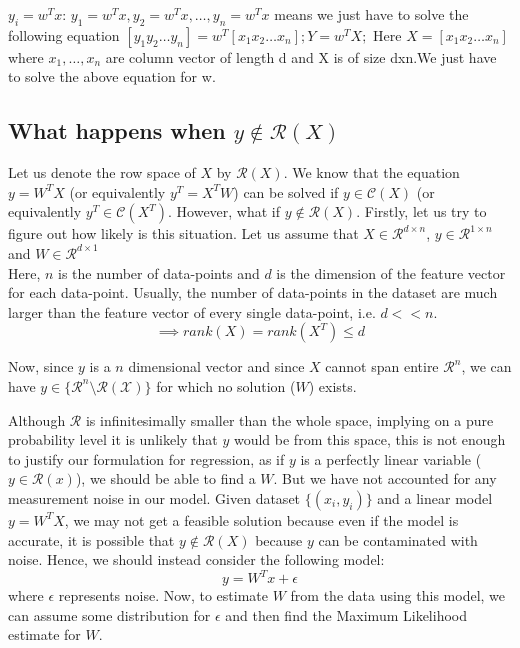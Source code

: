 \documentclass[11pt]{article}
\begin{document}
$ y_i =w^{T}x$:
$y_1 = w^{T}x, y_2 = w^{T}x , \ldots, y_n = w^{T}x$
means we just have to solve the following equation
$[y_1 y_2 \ldots y_n] = w^{T}[x_1 x_2 \ldots x_n];
Y = w^{T}X;$ Here $X = [x_1 x_2 \ldots x_n]
$
where $x_1, \ldots,x_n$ are column vector of length d and X is of size dxn.We just have to solve the above equation for w. 

\subsection{What happens when \texorpdfstring{$y \not \in \mathcal{R}(X)$}{}}
Let us denote the row space of $X$ by $\mathcal{R}(X)$. We know that the equation $y = W^T X$ (or equivalently $y^T = X^T W$) can be solved if $y \in \mathcal{C}(X)$ (or equivalently $y^T \in \mathcal{C}(X^T)$. However, what if $y \not\in \mathcal{R}(X)$. Firstly, let us try to figure out how likely is this situation. Let us assume that $X \in \mathcal{R}^{d \times n}$, $y \in \mathcal{R}^{1 \times n} $ and $W \in \mathcal{R}^{d \times 1} $ \\
Here, $n$ is the number of data-points and $d$ is the dimension of the feature vector for each data-point. Usually, the number of data-points in the dataset are much larger than the feature vector of every single data-point, i.e. $d << n$.
\begin{equation}
    \implies rank(X) = rank(X^T) \leq d
\end{equation}

Now, since $y$ is a $n$ dimensional vector and since $X$ cannot span entire $\mathcal{R}^n$, we can have $y \in \{\mathcal{R}^n \setminus \mathcal{R (X)}\}$ for which no solution ($W$) exists. 

Although $\mathcal{R}$ is infinitesimally smaller than the whole space, implying on a pure probability level it is unlikely that $y$ would be from this space, this is not enough to justify our formulation for regression, as if $y$ is a perfectly linear variable ($y \in \mathcal{R}(x)$), we should be able to find a $W$.
But we have not accounted for any measurement noise in our model. Given dataset $\{ (x_i , y_i) \}$ and a linear model $y = W^T X$, we may not get a feasible solution because even if the model is accurate, it is possible that $y \not \in \mathcal{R}(X)$ because $y$ can be contaminated with noise. Hence, we should instead consider the following model:
\begin{equation}
    y = W^T x + \epsilon
\end{equation}
where $\epsilon$ represents noise. Now, to estimate $W$ from the data using this model, we can assume some distribution for $\epsilon$ and then find the Maximum Likelihood estimate for $W$.
\end{document}
